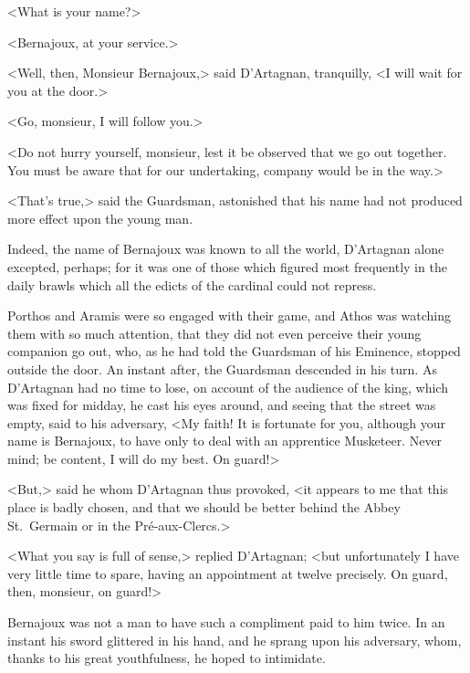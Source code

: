 <What is your name?> 

<Bernajoux, at your service.> 

<Well, then, Monsieur Bernajoux,> said D'Artagnan, tranquilly, <I will wait for you at the door.> 

<Go, monsieur, I will follow you.> 

<Do not hurry yourself, monsieur, lest it be observed that we go out together. You must be aware that for our undertaking, company would be in the way.> 

<That's true,> said the Guardsman, astonished that his name had not produced more effect upon the young man. 

Indeed, the name of Bernajoux was known to all the world, D'Artagnan alone excepted, perhaps; for it was one of those which figured most frequently in the daily brawls which all the edicts of the cardinal could not repress. 

Porthos and Aramis were so engaged with their game, and Athos was watching them with so much attention, that they did not even perceive their young companion go out, who, as he had told the Guardsman of his Eminence, stopped outside the door. An instant after, the Guardsman descended in his turn. As D'Artagnan had no time to lose, on account of the audience of the king, which was fixed for midday, he cast his eyes around, and seeing that the street was empty, said to his adversary, <My faith! It is fortunate for you, although your name is Bernajoux, to have only to deal with an apprentice Musketeer. Never mind; be content, I will do my best. On guard!> 

<But,> said he whom D'Artagnan thus provoked, <it appears to me that this place is badly chosen, and that we should be better behind the Abbey St.~Germain or in the Pré-aux-Clercs.> 

<What you say is full of sense,> replied D'Artagnan; <but unfortunately I have very little time to spare, having an appointment at twelve precisely. On guard, then, monsieur, on guard!> 

Bernajoux was not a man to have such a compliment paid to him twice. In an instant his sword glittered in his hand, and he sprang upon his adversary, whom, thanks to his great youthfulness, he hoped to intimidate. 

